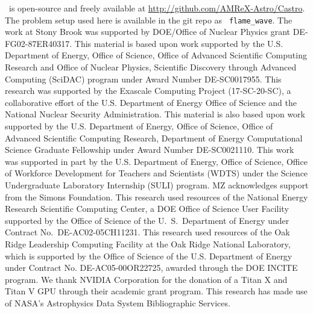 \documentclass[preprint,times,tighten]{aastex63}
\newcommand{\castro}{{\sf Castro}}
\begin{document}



\acknowledgments \castro\ is open-source and freely available at
\url{http://github.com/AMReX-Astro/Castro}.  The problem setup used
here is available in the git repo as {\tt
  flame\_wave}.  The work at Stony Brook was supported by DOE/Office
of Nuclear Physics grant DE-FG02-87ER40317.  This material is based upon work supported by the
U.S. Department of Energy, Office of Science, Office of Advanced
Scientific Computing Research and Office of Nuclear Physics, Scientific
Discovery through Advanced Computing (SciDAC) program under Award
Number DE-SC0017955.  This research was supported by the Exascale Computing Project (17-SC-20-SC), a collaborative effort of the U.S. Department of Energy Office of Science and the National Nuclear Security Administration.
This material is also based upon work supported by the U.S. Department
of Energy, Office of Science, Office of Advanced Scientific Computing Research, Department of
Energy Computational Science Graduate Fellowship under Award Number DE-SC0021110. This work was supported in part by the U.S. Department of Energy, Office of Science, Office of Workforce Development for Teachers and Scientists (WDTS) under the Science Undergraduate Laboratory Internship (SULI) program. MZ acknowledges support from the Simons Foundation. 
This research used resources of the National Energy
Research Scientific Computing Center, a DOE Office of Science User
Facility supported by the Office of Science of the U.~S.\ Department
of Energy under Contract No.\ DE-AC02-05CH11231.  This research used
resources of the Oak Ridge Leadership Computing Facility at the Oak
Ridge National Laboratory, which is supported by the Office of Science
of the U.S. Department of Energy under Contract No. DE-AC05-00OR22725,
awarded through the DOE INCITE program.  We thank NVIDIA Corporation
for the donation of a Titan X and Titan V GPU through their academic
grant program.  This research has made use of NASA's Astrophysics Data
System Bibliographic Services.








\end{document}
